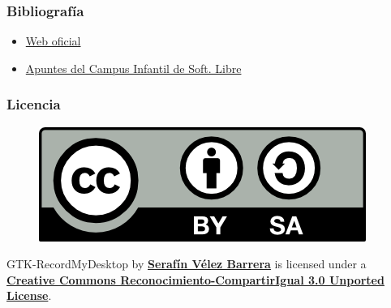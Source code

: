 \documentclass{beamer}
\begin{document}
		\begin{frame}
			\frametitle{Bibliografía}
			\begin{itemize}
				\item \href{http://recordmydesktop.sourceforge.net/about.php}{Web oficial}
				\item \href{http://osl.ugr.es/wp-content/uploads/2012/07/Manual-de-GtkRecordMyDesktop.pdf}{Apuntes del Campus Infantil de Soft. Libre}
			\end{itemize}
		\end{frame}

		\begin{frame}
			\frametitle{Licencia}
			\begin{figure}
				\includegraphics[keepaspectratio=true]{Licencia/By-sa.png}
			\end{figure}
			\begin{center}
				\Large GTK-RecordMyDesktop by \textbf{\href{http://seravb.wordpress.com}{Serafín Vélez Barrera}} is licensed under a
				\textbf{\href{http://creativecommons.org/licenses/by-sa/3.0/deed.es_ES}{Creative Commons Reconocimiento-CompartirIgual 3.0 Unported License}}.
			\end{center}
		\end{frame}
\end{document}
